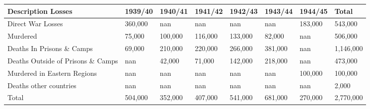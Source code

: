 \documentclass{article}
\begin{document}
\begin{tabular}{llllllll}
\toprule
Description Losses & 1939/40 & 1940/41 & 1941/42 & 1942/43 & 1943/44 & 1944/45 & Total \\
\midrule
Direct War Losses & 360,000 & nan & nan & nan & nan & 183,000 & 543,000 \\
Murdered & 75,000 & 100,000 & 116,000 & 133,000 & 82,000 & nan & 506,000 \\
Deaths In Prisons \& Camps & 69,000 & 210,000 & 220,000 & 266,000 & 381,000 & nan & 1,146,000 \\
Deaths Outside of Prisons \& Camps & nan & 42,000 & 71,000 & 142,000 & 218,000 & nan & 473,000 \\
Murdered in Eastern Regions & nan & nan & nan & nan & nan & 100,000 & 100,000 \\
Deaths other countries & nan & nan & nan & nan & nan & nan & 2,000 \\
Total & 504,000 & 352,000 & 407,000 & 541,000 & 681,000 & 270,000 & 2,770,000 \\
\bottomrule
\end{tabular}
\end{document}
